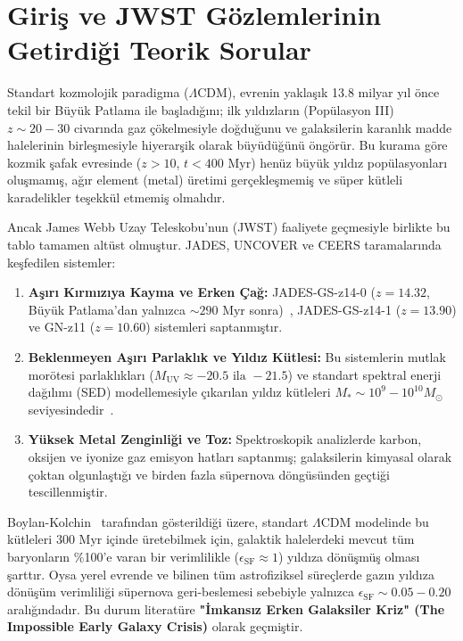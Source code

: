 \documentclass[11pt,a4paper]{article}
\begin{document}
\section{Giriş ve JWST Gözlemlerinin Getirdiği Teorik Sorular}
\label{sec:giris}

Standart kozmolojik paradigma ($\Lambda$CDM), evrenin yaklaşık 13.8 milyar yıl önce tekil bir Büyük Patlama ile başladığını; ilk yıldızların (Popülasyon III) $z \sim 20-30$ civarında gaz çökelmesiyle doğduğunu ve galaksilerin karanlık madde halelerinin birleşmesiyle hiyerarşik olarak büyüdüğünü öngörür. Bu kurama göre kozmik şafak evresinde ($z > 10$, $t < 400\text{ Myr}$) henüz büyük yıldız popülasyonları oluşmamış, ağır element (metal) üretimi gerçekleşmemiş ve süper kütleli karadelikler teşekkül etmemiş olmalıdır.

Ancak James Webb Uzay Teleskobu'nun (JWST) faaliyete geçmesiyle birlikte bu tablo tamamen altüst olmuştur. JADES, UNCOVER ve CEERS taramalarında keşfedilen sistemler:
\begin{enumerate}
    \item \textbf{Aşırı Kırmızıya Kayma ve Erken Çağ:} JADES-GS-z14-0 ($z = 14.32$, Büyük Patlama'dan yalnızca $\sim 290\text{ Myr}$ sonra)~\cite{carniani2024}, JADES-GS-z14-1 ($z = 13.90$) ve GN-z11 ($z = 10.60$) sistemleri saptanmıştır.
    \item \textbf{Beklenmeyen Aşırı Parlaklık ve Yıldız Kütlesi:} Bu sistemlerin mutlak morötesi parlaklıkları ($M_{\mathrm{UV}} \approx -20.5\text{ ila } -21.5$) ve standart spektral enerji dağılımı (SED) modellemesiyle çıkarılan yıldız kütleleri $M_* \sim 10^9 - 10^{10} M_\odot$ seviyesindedir~\cite{labbe2023}.
    \item \textbf{Yüksek Metal Zenginliği ve Toz:} Spektroskopik analizlerde karbon, oksijen ve iyonize gaz emisyon hatları saptanmış; galaksilerin kimyasal olarak çoktan olgunlaştığı ve birden fazla süpernova döngüsünden geçtiği tescillenmiştir.
\end{enumerate}

Boylan-Kolchin~\cite{boylan2023} tarafından gösterildiği üzere, standart $\Lambda$CDM modelinde bu kütleleri $300\text{ Myr}$ içinde üretebilmek için, galaktik halelerdeki mevcut tüm baryonların \%100'e varan bir verimlilikle ($\epsilon_{\mathrm{SF}} \approx 1$) yıldıza dönüşmüş olması şarttır. Oysa yerel evrende ve bilinen tüm astrofiziksel süreçlerde gazın yıldıza dönüşüm verimliliği süpernova geri-beslemesi sebebiyle yalnızca $\epsilon_{\mathrm{SF}} \sim 0.05 - 0.20$ aralığındadır. Bu durum literatüre \textbf{"İmkansız Erken Galaksiler Kriz" (The Impossible Early Galaxy Crisis)} olarak geçmiştir.
\end{document}
